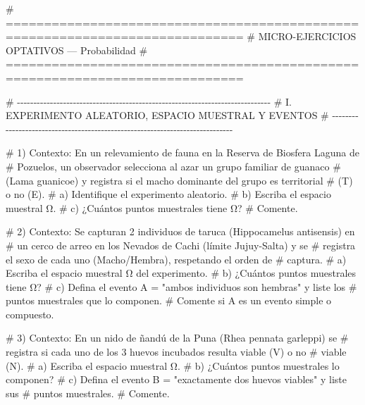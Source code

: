 \documentclass[
  spanish,
  letterpaper,
  DIV=11,
  numbers=noendperiod]{scrreprt}
\newenvironment{Shaded}{\begin{snugshade}}{\end{snugshade}}
\newcommand{\CommentTok}[1]{\textcolor[rgb]{0.37,0.37,0.37}{#1}}
\begin{document}
\begin{Shaded}
\begin{Highlighting}[]


\CommentTok{\# =============================================================================}
\CommentTok{\# MICRO{-}EJERCICIOS OPTATIVOS — Probabilidad}
\CommentTok{\# =============================================================================}

\CommentTok{\# {-}{-}{-}{-}{-}{-}{-}{-}{-}{-}{-}{-}{-}{-}{-}{-}{-}{-}{-}{-}{-}{-}{-}{-}{-}{-}{-}{-}{-}{-}{-}{-}{-}{-}{-}{-}{-}{-}{-}{-}{-}{-}{-}{-}{-}{-}{-}{-}{-}{-}{-}{-}{-}{-}{-}{-}{-}{-}{-}{-}{-}{-}{-}{-}{-}{-}{-}{-}{-}{-}{-}{-}{-}{-}{-}{-}{-}}
\CommentTok{\# I. EXPERIMENTO ALEATORIO, ESPACIO MUESTRAL Y EVENTOS}
\CommentTok{\# {-}{-}{-}{-}{-}{-}{-}{-}{-}{-}{-}{-}{-}{-}{-}{-}{-}{-}{-}{-}{-}{-}{-}{-}{-}{-}{-}{-}{-}{-}{-}{-}{-}{-}{-}{-}{-}{-}{-}{-}{-}{-}{-}{-}{-}{-}{-}{-}{-}{-}{-}{-}{-}{-}{-}{-}{-}{-}{-}{-}{-}{-}{-}{-}{-}{-}{-}{-}{-}{-}{-}{-}{-}{-}{-}{-}{-}}

\CommentTok{\# 1) Contexto: En un relevamiento de fauna en la Reserva de Biosfera Laguna de}
\CommentTok{\#    Pozuelos, un observador selecciona al azar un grupo familiar de guanaco}
\CommentTok{\#    (Lama guanicoe) y registra si el macho dominante del grupo es territorial}
\CommentTok{\#    (T) o no (E).}
\CommentTok{\#    a) Identifique el experimento aleatorio.}
\CommentTok{\#    b) Escriba el espacio muestral Ω.}
\CommentTok{\#    c) ¿Cuántos puntos muestrales tiene Ω?}
\CommentTok{\#    Comente.}


\CommentTok{\# 2) Contexto: Se capturan 2 individuos de taruca (Hippocamelus antisensis) en}
\CommentTok{\#    un cerco de arreo en los Nevados de Cachi (límite Jujuy{-}Salta) y se}
\CommentTok{\#    registra el sexo de cada uno (Macho/Hembra), respetando el orden de}
\CommentTok{\#    captura.}
\CommentTok{\#    a) Escriba el espacio muestral Ω del experimento.}
\CommentTok{\#    b) ¿Cuántos puntos muestrales tiene Ω?}
\CommentTok{\#    c) Defina el evento A = "ambos individuos son hembras" y liste los}
\CommentTok{\#       puntos muestrales que lo componen.}
\CommentTok{\#    Comente si A es un evento simple o compuesto.}


\CommentTok{\# 3) Contexto: En un nido de ñandú de la Puna (Rhea pennata garleppi) se}
\CommentTok{\#    registra si cada uno de los 3 huevos incubados resulta viable (V) o no}
\CommentTok{\#    viable (N).}
\CommentTok{\#    a) Escriba el espacio muestral Ω.}
\CommentTok{\#    b) ¿Cuántos puntos muestrales lo componen?}
\CommentTok{\#    c) Defina el evento B = "exactamente dos huevos viables" y liste sus}
\CommentTok{\#       puntos muestrales.}
\CommentTok{\#    Comente.}



\end{Highlighting}
\end{Shaded}
\end{document}
